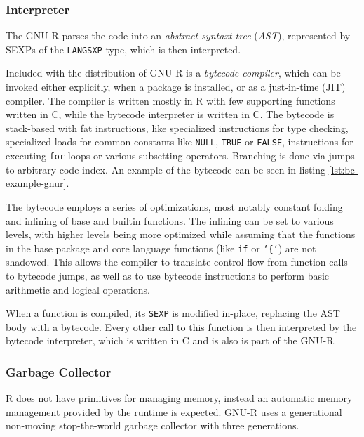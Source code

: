 \subsubsection*{Interpreter}

The GNU-R parses the code into an \textit{abstract syntaxt tree} (\textit{AST}), represented by SEXPs of the \texttt{LANGSXP} type, which is then interpreted.

Included with the distribution of GNU-R is a \textit{bytecode compiler}, which can be invoked either explicitly, when a package is installed, or as a just-in-time (JIT) compiler. The compiler is written mostly in R with few supporting functions written in C, while the bytecode interpreter is written in C. The bytecode is stack-based with fat instructions, like specialized instructions for type checking, specialized loads for common constants like \texttt{NULL}, \texttt{TRUE} or \texttt{FALSE}, instructions for executing \texttt{for} loops or various subsetting operators. Branching is done via jumps to arbitrary code index. An example of the bytecode can be seen in listing \ref{lst:bc-example-gnur}.

The bytecode employs a series of optimizations, most notably constant folding and inlining of base and builtin functions. The inlining can be set to various levels, with higher levels being more optimized while assuming that the functions in the base package and core language functions (like \texttt{if} or \texttt{`\{`}) are not shadowed. This allows the compiler to translate control flow from function calls to bytecode jumps, as well as to use bytecode instructions to perform basic arithmetic and logical operations.

When a function is compiled, its \texttt{SEXP} is modified in-place, replacing the AST body with a bytecode. Every other call to this function is then interpreted by the bytecode interpreter, which is written in C and is also is part of the GNU-R.



\subsubsection*{Garbage Collector}
R does not have primitives for managing memory, instead an automatic memory management provided by the runtime is expected. GNU-R uses a generational non-moving stop-the-world garbage collector with three generations\cite{r-gc-notes}.

